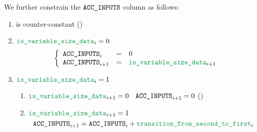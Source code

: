 We further constrain the $\texttt{ACC\_INPUTS}$ column as follows:
\begin{enumerate}
    \item \accInputs{} is counter-constant \quad (\trash)
    \item \If $\locIsVariableSizeData_{i} = 0$ ~\Then
        \[
            \left\{ \begin{array}{lcl}
                \accInputs_{i}     & = & 0                            \\
                \accInputs_{i + 1} & = & \locIsVariableSizeData_{i + 1} \\
            \end{array} \right.
        \]
    \item \If $\locIsVariableSizeData_{i} = 1$ \Then 
        \begin{enumerate}
            \item \If $\locIsVariableSizeData _{i + 1} = 0$ ~\Then $\texttt{ACC\_INPUTS}_{i + 1} = 0$ \quad (\sanityCheck)
            \item \If $\locIsVariableSizeData _{i + 1} = 1$ ~\Then
                \[
                    \accInputs _{i + 1} = \accInputs _{i} + \locTransitionFromSecondToFirst _{i}
                \]
        \end{enumerate}
\end{enumerate}
